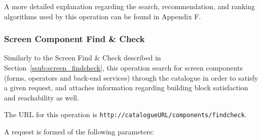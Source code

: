 \documentclass{fast_latex}
\begin{document}
A more detailed explanation regarding the search, recommendation, and ranking algorithms used by this operation can be found in Appendix F.

\subsubsection{Screen Component Find \& Check} %
\label{ssub:screen_component_findcheck}

Similarly to the Screen Find \& Check described in Section~\ref{ssub:screen_findcheck}, this operation search for screen components (forms, operators and back-end services) through the catalogue in order to satisfy a given request, and attaches information regarding building block satisfaction and reachability as well.

The URL for this operation is \verb|http://catalogueURL/components/findcheck|.

A request is formed of the following parameters:
\end{document}
